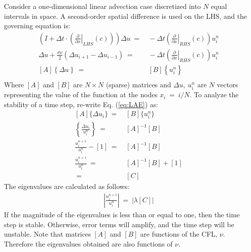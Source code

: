 \documentclass[conf]{new-aiaa}
\begin{document}
Consider a one-dimensional linear advection case discretized into $N$ equal intervals in space. 
A second-order spatial difference is used on the LHS, and the governing equation is:
\begin{equation}
	\begin{split}
		\label{eq:LAE}
  			\left(I+\Delta{t}\cdot\left(\left.\frac{\partial}{\partial{x}}\right|_{LHS}\left(c\right)\right)\right)\Delta{u}~=&~-\Delta{t}\left(\left.\frac{\partial}{\partial{x}}\right|_{RHS}\left(c\right)\right) {u}_i^{n} \\
  			\Delta{u}+\frac{\sigma\nu}{2}\left(\Delta{u_{i+1}}-\Delta{u_{i-1}} \right)~=&~-\Delta{t}\left(\left.\frac{\partial}{\partial{x}}\right|_{RHS}\left(c\right)\right) {u}_i^{n} \\
  			\left[A\right]\left\{\Delta{u}\right\}~=&~\left[B\right]\left\{u_{i}^{n}\right\} \\
	\end{split}
\end{equation}
Where $[A]$ and $[B]$ are $N\times{N}$ (sparse) matrices and $\Delta{u},~u_{i}^{n}$ are $N$ vectors representing the value of the function at the nodes $x_i~=~i/N$.
To analyze the stability of a time step, re-write Eq. (\ref{eq:LAE}) as:
\begin{equation}
\label{eq:AB}
	\begin{split}
  		[A]\{\Delta{u_i\}}~=&~[B]\{u_i^{n}\} \\
  		\left\{\frac{\Delta{u_i}}{u_i^{n}}\right\}~=&~[A]^{-1}[B] \\
  		\frac{u_i^{n+1}}{u_i^{n}} - [1]~=&~[A]^{-1}[B] \\
  		\frac{u_i^{n+1}}{u_i^{n}}~=&~[A]^{-1}[B] + [1] \\
  		~=&~[C]
	\end{split}
\end{equation}
The eigenvalues are calculated as follows:
\begin{equation}
	\begin{split}
		\label{eq:Magnitude_Of_Eigen}
  			\left|\frac{u_i^{n+1}}{u_i^{n}}\right|~=~\left|\lambda\left[C\right]\right|
	\end{split}
\end{equation}
If the magnitude of the eigenvalues is less than or equal to one, then the time step is stable.  
Otherwise, error terms will amplify, and the time step will be unstable.
Note that matrices $[A]$ and $[B]$ are functions of the CFL, $\nu$. 
Therefore the eigenvalues obtained are also functions of $\nu$. 
\end{document}
